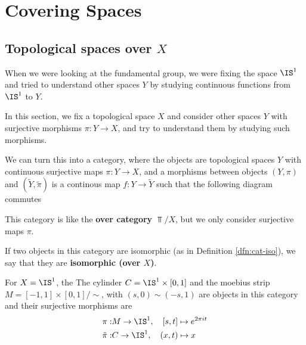\section{Covering Spaces}
\subsection{Topological spaces over $X$}
When we were looking at the fundamental group, we were fixing the space $\IS^{1}$ and tried to understand other spaces $Y$ by studying continuous functions from $\IS^{1}$ to $Y$.

In this section, we fix a topological space $X$ and consider other spaces $Y$ with surjective morphisms $\pi: Y \to  X$, and try to understand them by studying such morphisms.

We can turn this into a category, where the objects are topological spaces $Y$ with continuous surjective maps $\pi: Y \to X$, and a morphisms between objects $(Y, \pi)$ and $(\tilde{Y}, \tilde{\pi})$ is a continous map $f: Y \to  \tilde{Y}$ such that the following diagram commutes
\begin{center}
\end{center}
This category is like the \textbf{over category} $\Top/X$, but we only consider surjective maps $\pi$.

\begin{dfn}[]
  If two objects in this category are isomorphic (as in Definition \ref{dfn:cat-iso}),
  we say that they are \textbf{isomorphic (over $X$)}.
\end{dfn}

\begin{ex}[]
  For $X = \IS^{1}$, the
  The cylinder $C = \IS^{1} \times [0,1]$ and the moebius strip $M= [-1,1] \times [0,1]/\sim$, with $(s,0) \sim (-s,1)$
  are objects in this category and their surjective morphisms are 
  \begin{align*}
    \pi: &M \to \IS^{1}, \quad [s,t] \mapsto  e^{2 \pi i t}\\
    \tilde{\pi}: &C \to \IS^{1}, \quad (x,t) \mapsto x
  \end{align*}
\end{ex}

